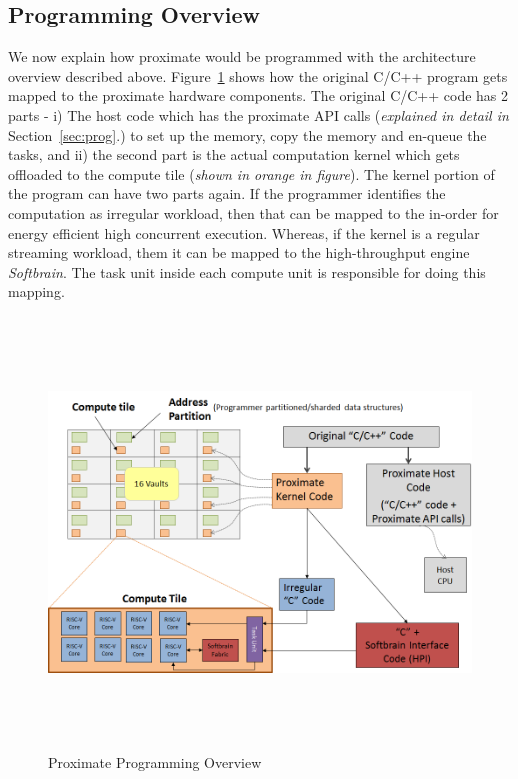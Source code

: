 \subsection{Programming Overview}
We now explain how proximate would be programmed with the architecture overview 
described above. Figure~\ref{fig:prog-overview} shows how the original C/C++
program gets mapped to the proximate hardware components. The original C/C++ code
has 2 parts - i) The host code which has the proximate API calls (\emph{explained in detail in} Section~\ref{sec:prog}.)
to set up the memory, copy the memory
and en-queue the tasks, and ii) the second part is the actual computation kernel which gets offloaded to the compute tile
(\emph{shown in orange in figure}). The kernel portion of the program can have two parts again. If the programmer
identifies the computation as irregular workload, then that can be mapped to the in-order for energy efficient 
high concurrent execution. Whereas, if the kernel is a regular streaming workload, them it can be
mapped to the high-throughput engine \emph{Softbrain}. The task unit inside each compute unit is responsible for doing this mapping.  

\begin{figure}
  \begin{center}
    \includegraphics[width=\linewidth, height=4.5in]{cs758-figs/prog-overview.png}
  \end{center}
\vspace{-0.2in}
  \caption{Proximate Programming Overview}
  \label{fig:prog-overview}
\vspace{-0.05in}
\end{figure}

